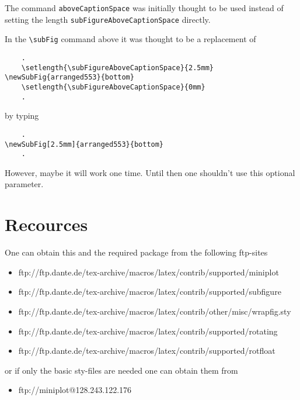 \documentclass[12pt,a4paper]{article}
\newcommand{\comm}[1]{\texttt{#1}}
\begin{document}
The command \comm{aboveCaptionSpace} was initially thought to be used instead of setting the
length \comm{subFigureAboveCaptionSpace} directly.

In the \verb+\subFig+ command above it was thought to be a replacement of

\begin{verbatim}
    .
    \setlength{\subFigureAboveCaptionSpace}{2.5mm}
\newSubFig{arranged553}{bottom}
    \setlength{\subFigureAboveCaptionSpace}{0mm}
    .
\end{verbatim}

by typing

\begin{verbatim}
    .
\newSubFig[2.5mm]{arranged553}{bottom}
    .
\end{verbatim}

However, maybe it will work one time. Until then one shouldn't use this 
optional parameter.


\clearpage









\section{Recources}

One can obtain this and the required package from the following ftp-sites

\begin{itemize}
  \item ftp://ftp.dante.de/tex-archive/macros/latex/contrib/supported/miniplot
  \item ftp://ftp.dante.de/tex-archive/macros/latex/contrib/supported/subfigure
  \item ftp://ftp.dante.de/tex-archive/macros/latex/contrib/other/misc/wrapfig.sty
  \item ftp://ftp.dante.de/tex-archive/macros/latex/contrib/supported/rotating
  \item ftp://ftp.dante.de/tex-archive/macros/latex/contrib/supported/rotfloat
\end{itemize}

or if only the basic sty-files are needed one can obtain them from 

\begin{itemize}
  \item ftp://miniplot@128.243.122.176
\end{itemize}
\end{document}
